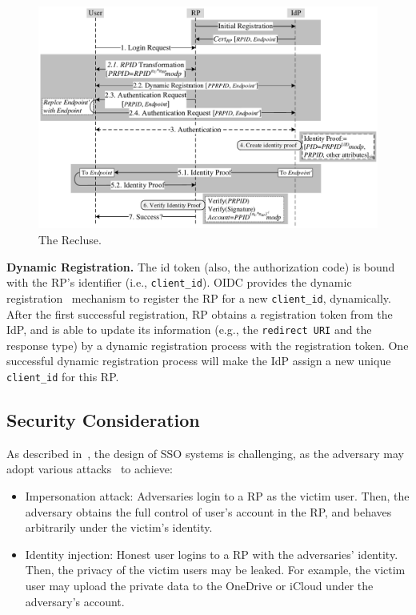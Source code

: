 \begin{figure}
  \centering
  \includegraphics[width=\linewidth]{fig/overview1.pdf}
  \caption{The Recluse.}
  \label{fig:Recluse}
\end{figure}

\noindent\textbf{Dynamic Registration.} The id token (also, the authorization code) is bound with the RP's identifier (i.e., \verb+client_id+). OIDC provides the dynamic registration~\cite{DynamicRegistration} mechanism to register the RP for a new \verb+client_id+, dynamically. After the first successful registration, RP obtains a registration token from the IdP, and is able to update its information (e.g., the \verb+redirect URI+ and the  response type) by a dynamic registration process with the  registration token. One successful dynamic registration process  will make the IdP assign a new unique \verb+client_id+ for this RP.

\subsection{Security Consideration}
\label{subsec:securityconsideration}
As described in~\cite{SPRESSO}, the design of SSO systems is challenging, as the adversary may adopt various attacks~\cite{ChenPCTKT14, FettKS16, WangCW12, WangZLG16, ZhouE14, rfc6819, YangLLZH16} to achieve:
\begin{itemize}
\item Impersonation attack: Adversaries login to a RP as the victim user. Then, the adversary obtains the full control of user's account in the RP, and behaves arbitrarily under the victim's identity.
\item Identity injection: Honest user logins to a RP with the adversaries' identity. Then, the privacy of the victim users may be leaked. For example, the victim user may upload the private data to the OneDrive or iCloud under the adversary's account.
\end{itemize}

